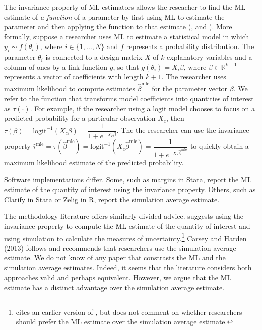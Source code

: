 \documentclass[11pt]{article}
\begin{document}
The invariance property of ML estimators allows the reseacher to find the ML estimate of \textit{a function} of a parameter by first using ML to estimate the parameter and then applying the function to that estimate (\citealt[pp. 75-76]{King1989}, and \citealt[pp. 320-321]{CasellaBerger2002}).
More formally, suppose a researcher uses ML to estimate a statistical model in which $y_i {\sim} f(\theta_i)$, where $i \in \{1,\ldots, N\}$ and $f$ represents a probability distribution. 
The parameter $\theta_i$ is connected to a design matrix $X$ of $k$ explanatory variables and a column of ones by a link function $g$, so that $g(\theta_i) = X_i\beta$, where $\beta \in \mathbb{R}^{k+1}$ represents a vector of coefficients with length $k + 1$.
The researcher uses maximum likelihood to compute estimates $\hat{\beta}^{\text{mle}}$ for the parameter vector $\beta$.
We refer to the function that transforms model coefficients into quantities of interest as $\tau(\cdot)$.
For example, if the researcher using a logit model chooses to focus on a predicted probability for a particular observation $X_c$, then $\tau(\beta) = \text{logit}^{-1}( X_c \beta) = \dfrac{1}{1 + e^{-X_c\beta}}$. 
The the researcher can use the invariance property $\hat{\tau}^{\text{mle}} = \tau \left( \hat{\beta}^{\text{mle}}\right) = \text{logit}^{-1} \left( X_c \hat{\beta}^{\text{mle}} \right) = \dfrac{1}{1 + e^{-X_c \hat{\beta}^{\text{mle}}}}$ to quickly obtain a maximum likelihood estimate of the predicted probability.

Software implementations differ.
Some, such as margins in Stata, report the ML estimate of the quantity of interest using the invariance property. 
Others, such as Clarify in Stata or Zelig in R, report the simulation average estimate.

The methodology literature offers similarly divided advice.
\cite{Herron1999} suggests using the invariance property to compute the ML estimate of the quantity of interest and using simulation to calculate the measures of uncertainty.\footnote{\cite{Herron1999} cites an earlier version of \cite{KingTomzWittenberg2000}, but does not comment on whether researchers should prefer the ML estimate over the simulation average estimate.}
Carsey and Harden (2013) follows \cite{KingTomzWittenberg2000} and recommends that researchers use the simulation average estimate.
We do not know of any paper that constrasts the ML and the simulation average estimates. 
Indeed, it seems that the literature considers both approaches valid and perhaps equivalent.
However, we argue that the ML estimate has a distinct advantage over the simulation average estimate.
\end{document}
